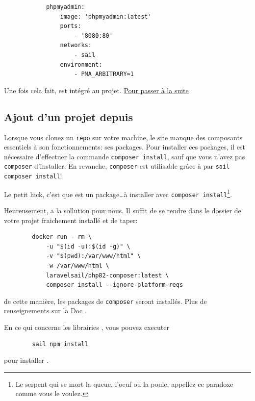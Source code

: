 \documentclass[internal]{nhitec_design}
\begin{document}
        \begin{lstlisting}
            phpmyadmin:
                image: 'phpmyadmin:latest' 
                ports:
                    - '8080:80' 
                networks:
                    - sail 
                environment:
                    - PMA_ARBITRARY=1
        \end{lstlisting}

        Une fois cela fait, \phpmyadmin{} est intégré au projet.
        \hyperref[sec:utilisation]{Pour passer à la suite}
    
    \subsection[Ajout d'un projet depuis GitHub]{Ajout d'un projet depuis \github{} \label{sec:project_git}}

    Lorsque vous clonez un \texttt{repo} sur votre machine, le site manque des composants essentiels à son fonctionnements: ses packages. Pour installer ces packages, il est nécessaire d'effectuer la commande \verb|composer install|, sauf que vous n'avez pas \texttt{composer} d'installer. En revanche, \texttt{composer} est utilisable grâce à  \laravelsail{} par \verb|sail composer install|!

    Le petit hick, c'est que \laravelsail{} est un package\ldots à installer avec \verb|composer install|\footnote{Le serpent qui se mort la queue, l'oeuf ou la poule, appellez ce paradoxe comme vous le voulez.}. 

    Heureusement, \laravel{} a la sollution pour nous. Il suffit de se rendre dans le dossier de votre projet fraichement installé et de taper:
    \begin{lstlisting}
        docker run --rm \
            -u "$(id -u):$(id -g)" \
            -v "$(pwd):/var/www/html" \
            -w /var/www/html sail/php82-composer:latest \
            composer install --ignore-platform-reqs
    \end{lstlisting}

    de cette manière, les packages de \texttt{composer} seront installés. Plus de renseignements sur la \href{https://laravel.com/docs/10.x/sail#installing-composer-dependencies-for-existing-projects}{Doc \laravel}.

    En ce qui concerne les librairies \js{}, vous pouvez executer 
    \begin{lstlisting}
        sail npm install
    \end{lstlisting}
    pour installer \vite.
\end{document}
